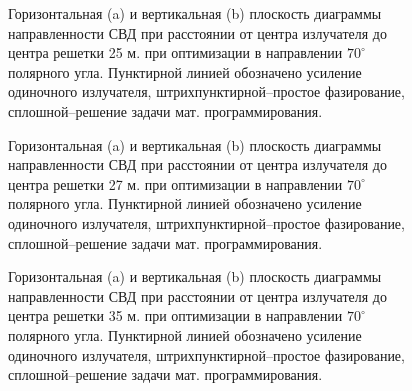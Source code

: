 \begin{figure}
\begin{minipage}[h]{0.49\linewidth}
\end{minipage}
\hfill
\begin{minipage}[h]{0.49\linewidth}
\end{minipage}
\caption{Горизонтальная (a) и вертикальная (b) плоскость диаграммы направленности СВД при расстоянии от центра излучателя до центра решетки 25 м. при оптимизации в направлении $70^{\circ}$ полярного угла. Пунктирной линией обозначено усиление одиночного излучателя, штрихпунктирной--простое фазирование, сплошной--решение задачи мат. программирования.}
\label{ris:svd_mut_5_70_25}
\end{figure}

\begin{figure}
\begin{minipage}[h]{0.49\linewidth}
\end{minipage}
\hfill
\begin{minipage}[h]{0.49\linewidth}
\end{minipage}
\caption{Горизонтальная (a) и вертикальная (b) плоскость диаграммы направленности СВД при расстоянии от центра излучателя до центра решетки 27 м. при оптимизации в направлении $70^{\circ}$ полярного угла. Пунктирной линией обозначено усиление одиночного излучателя, штрихпунктирной--простое фазирование, сплошной--решение задачи мат. программирования.}
\label{ris:svd_mut_5_70_27}
\end{figure}

\begin{figure}
\begin{minipage}[h]{0.49\linewidth}
\end{minipage}
\hfill
\begin{minipage}[h]{0.49\linewidth}
\end{minipage}
\caption{Горизонтальная (a) и вертикальная (b) плоскость диаграммы направленности СВД при расстоянии от центра излучателя до центра решетки 35 м. при оптимизации в направлении $70^{\circ}$ полярного угла. Пунктирной линией обозначено усиление одиночного излучателя, штрихпунктирной--простое фазирование, сплошной--решение задачи мат. программирования.}
\label{ris:svd_mut_5_70_35}
\end{figure}

